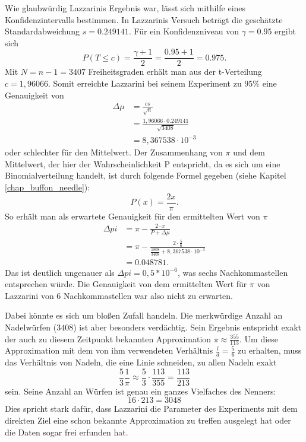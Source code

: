 \documentclass[10pt,twocolumn]{scrartcl}
\begin{document}
	Wie glaubwürdig Lazzarinis Ergebnis war, lässt sich mithilfe eines Konfidenzintervalls bestimmen.
	In Lazzarinis Versuch beträgt die geschätzte Standardabweichung $s = 0.249141$.
	Für ein Konfidenzniveau von $\gamma = 0.95$ ergibt sich
	\begin{equation}
	P(T \le c) = \frac{\gamma + 1}{2} = \frac{0.95 + 1}{2} = 0.975 .
	\end{equation}
	Mit $N = n - 1 = 3407$ Freiheitsgraden erhält man aus der t-Verteilung $c = 1,96066$.
	Somit erreichte Lazzarini bei seinem Experiment zu $95\%$ eine Genauigkeit von
	\begin{align}
	\Delta \mu &= \frac{cs}{\sqrt{n}} \\
	&= \frac{1,96066 \cdot 0.249141}{\sqrt{3408}} \\ \nonumber
	&= 8,367538 \cdot 10 ^{-3} \nonumber
	\end{align}
	oder schlechter für den Mittelwert. Der Zusammenhang von $\pi$ und dem Mittelwert, der hier der Wahrscheinlichkeit P entspricht, da es sich um eine Binomialverteilung handelt, ist durch folgende Formel gegeben (siehe Kapitel \ref{chap_buffon_needle}):
	\begin{equation}
	P(x) = \frac{2x}{\pi}.
	\end{equation}
	So erhält man als erwartete Genauigkeit für den ermittelten Wert von $\pi$
	\begin{align}
	\Delta pi &= \pi - \frac{2 \cdot x}{P + \Delta \mu} \\
	&= \pi - \frac{2 \cdot \frac{5}{6}}{\frac{1808}{3408} + 8,367538 \cdot 10 ^{-3}} \\ \nonumber
	&= 0.048781 \nonumber .
	\end{align}
	Das ist deutlich ungenauer als $\Delta pi = 0,5 * 10^{-6}$, was sechs Nachkommastellen entsprechen würde.
	Die Genauigkeit von dem ermittelten Wert für $\pi$ von Lazzarini von 6 Nachkommastellen war also nicht zu erwarten.
	
	Dabei könnte es sich um bloßen Zufall handeln. Die merkwürdige Anzahl an Nadelwürfen ($3408$) ist aber besonders verdächtig. Sein Ergebnis entspricht exakt der auch zu diesem Zeitpunkt bekannten Approximation $\pi \approx \frac{355}{113}$.
	Um diese Approximation mit dem von ihm verwendeten Verhältnis ${\tfrac {l}{d}={\tfrac {5}{6}}}$ zu erhalten, muss das Verhältnis von Nadeln, die eine Linie schneiden, zu allen Nadeln exakt
	\begin{equation}
	\frac{5}{3} \frac{1}{\pi}  \approx \frac{5}{3} \cdot \frac{113}{355} = \frac{113}{213}
	\end{equation}
	sein.
	Seine Anzahl an Würfen ist genau ein ganzes Vielfaches des Nenners:
	\begin{equation}
	16 \cdot 213 = 3048
	\end{equation}
	Dies spricht stark dafür, dass Lazzarini die Parameter des Experiments mit dem direkten Ziel eine schon bekannte Approximation zu treffen ausgelegt hat oder die Daten sogar frei erfunden hat. \cite{Badger}
	
\end{document}
